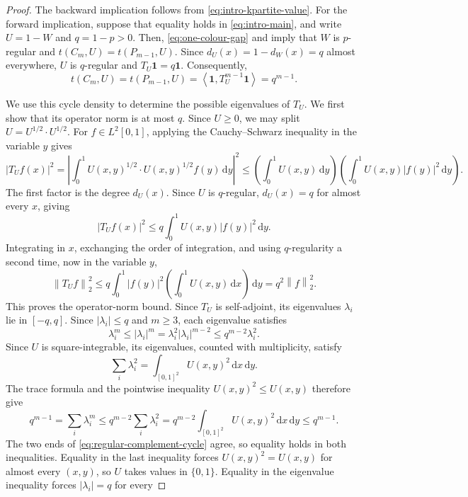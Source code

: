 \documentclass[11pt]{article}
\theoremstyle{remark}
\numberwithin{equation}{section}
\newcommand{\one}{\mathbf 1}
\newcommand{\ip}[2]{\left\langle #1,#2\right\rangle}
\newcommand{\norm}[1]{\left\lVert #1\right\rVert}
\newcommand{\dd}{\,\mathrm d}
\newcommand{\tC}[2]{t(C_{#1},#2)}
\newcommand{\tP}[2]{t(P_{#1},#2)}
\newcommand{\Tker}[1]{T_{#1}}
\newcommand{\dW}{d_W}
\newcommand{\intsq}{\int_{[0,1]^2}}
\newcommand{\ddxy}{\dd x\dd y}
\begin{document}
\begin{proof}
  The backward implication follows from \eqref{eq:intro-kpartite-value}.
  For the forward implication, suppose that equality holds in
  \eqref{eq:intro-main}, and write $U=1-W$ and $q=1-p>0$.
  Then, \eqref{eq:one-colour-gap} and  imply
  that $W$ is $p$-regular and $\tC mU=\tP{m-1}U$.
  Since $d_U(x)=1-\dW(x)=q$ almost everywhere, $U$ is $q$-regular
  and $\Tker U\one=q\one$. Consequently,
  \[
    \tC mU=\tP{m-1}U
    =\ip\one{\Tker U^{m-1}\one}=q^{m-1}.
  \]

  We use this cycle density to determine the possible eigenvalues of
  $\Tker U$. We first show that its operator norm is at most $q$.
  Since $U\ge0$, we may split $U=U^{1/2}\cdot U^{1/2}$.
  For $f\in L^2[0,1]$, applying the Cauchy--Schwarz inequality in the
  variable $y$ gives
  \[
    \bigl|\Tker Uf(x)\bigr|^2
    =\left|\int_0^1 U(x,y)^{1/2}\cdot U(x,y)^{1/2}f(y)\dd y\right|^2
    \le\left(\int_0^1 U(x,y)\dd y\right)
      \left(\int_0^1 U(x,y)\bigl|f(y)\bigr|^2\dd y\right).
  \]
  The first factor is the degree $d_U(x)$. Since $U$ is $q$-regular,
  $d_U(x)=q$ for almost every $x$, giving
  \[
    \bigl|\Tker Uf(x)\bigr|^2\le q\int_0^1 U(x,y)\bigl|f(y)\bigr|^2\dd y .
  \]
  Integrating in $x$, exchanging the order of integration, and using $q$-regularity a
  second time, now in the variable $y$,
  \[
    \norm{\Tker Uf}_2^2
    \le q\int_0^1\bigl|f(y)\bigr|^2
      \left(\int_0^1 U(x,y)\dd x\right)\dd y
    =q^2\norm f_2^2 .
  \]
  This proves the operator-norm bound. Since $\Tker U$ is self-adjoint,
  its eigenvalues $\lambda_i$ lie in $[-q,q]$.
  Since $|\lambda_i|\le q$ and $m\ge3$, each eigenvalue satisfies
  \[
    \lambda_i^m\le|\lambda_i|^m
    =\lambda_i^2|\lambda_i|^{m-2}
    \le q^{m-2}\lambda_i^2.
  \]
  Since $U$ is square-integrable, its eigenvalues, counted with
  multiplicity, satisfy
  \[
    \sum_i\lambda_i^2=\intsq U(x,y)^2\ddxy.
  \]
  The trace formula and the pointwise inequality $U(x,y)^2\le U(x,y)$ therefore give
  \begin{equation}\label{eq:regular-complement-cycle}
    q^{m-1}=\sum_i\lambda_i^m
    \le q^{m-2}\sum_i\lambda_i^2
    =q^{m-2}\intsq U(x,y)^2\ddxy
    \le q^{m-1}.
  \end{equation}
  The two ends of \eqref{eq:regular-complement-cycle} agree, so equality
  holds in both inequalities. Equality in the last inequality forces
  $U(x,y)^2=U(x,y)$ for almost every $(x,y)$, so $U$ takes values in $\{0,1\}$.
  Equality in the eigenvalue inequality forces $|\lambda_i|=q$ for every

\end{proof}
\end{document}
